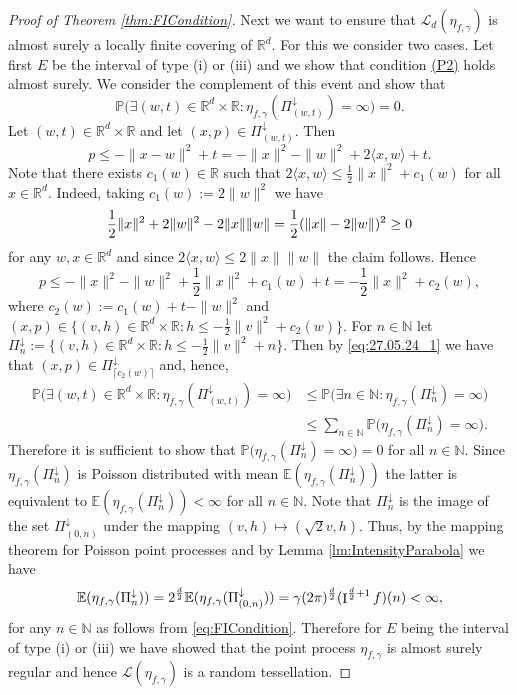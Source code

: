 \documentclass[11pt,a4paper]{article}
\theoremstyle{plain}
\theoremstyle{definition}
\theoremstyle{remark}
\def\EE{\mathbb{E}}
\def\NN{\mathbb{N}}
\def\PP{\mathbb{P}}
\def\RR{\mathbb{R}}
\def\cL{\mathcal{L}}
\newcommand{\frI}{\mathop{\mathrm{I}}\nolimits}
\begin{document}
\begin{proof}[Proof of Theorem \ref{thm:FICondition}]
    Next we want to ensure that $\cL_d(\eta_{f,\gamma})$ is almost surely a locally finite covering of $\RR^d$. For this we consider two cases. Let first $E$ be the interval of type (i) or (iii) and we show that condition \hyperref[item:P2]{(P2)} holds almost surely.
    We consider the complement of this event and show that 
    \[
        \PP\big(\exists (w,t) \in \RR^d \times \RR: \eta_{f,\gamma}(\Pi_{(w,t)}^\downarrow) = \infty\big) = 0. 
    \]
    Let $(w,t)\in \RR^d \times \RR$ and let $(x,p)\in \Pi_{(w,t)}^\downarrow$. Then 
    \[
        p\le -\|x-w\|^2+t=-\|x\|^2-\|w\|^2+2 \langle x,w \rangle +t.
    \]
    Note that there exists $c_1(w)\in \RR$ such that $2\langle x,w \rangle \le \frac{1}{2}\|x\|^2+c_1(w)$ for all $x\in \RR^d$. Indeed, taking $c_1(w):=2\|w\|^2$ we have 
    \[
        {1\over 2}\|x\|^2+2\|w\|^2-2\|x\|\|w\|={1\over 2}(\|x\|-2\|w\|)^2\ge 0
    \]
    for any $w,x\in\RR^d$ and since $2\langle x,w\rangle\leq 2\|x\|\|w\|$ the claim follows. Hence 
    \begin{equation}\label{eq:27.05.24_1}
        p\le -\|x\|^2-\|w\|^2+\frac{1}{2}\|x\|^2+c_1(w)+t=-\frac{1}{2}\|x\|^2+c_2(w),
    \end{equation}
    where $c_2(w):=c_1(w)+t-\|w\|^2$ and $(x,p)\in \{(v,h)\in \RR^d \times \RR: h\le -\frac{1}{2}\|v\|^2+c_2(w)\}$. For $n\in \NN$ let $\Pi_n^\downarrow:=\{(v,h)\in \RR^d \times \RR: h\le -\frac{1}{2}\|v\|^2+n\}$. Then by \eqref{eq:27.05.24_1} we have that $(x,p)\in \Pi_{\lceil c_2(w)\rceil}^\downarrow$ and, hence,
    \begin{align*}
        \PP\big(\exists (w,t) \in \RR^d \times \RR: \eta_{f,\gamma}(\Pi_{(w,t)}^\downarrow) = \infty\big)
        &\le \PP\big(\exists n\in \NN: \eta_{f,\gamma}(\Pi_n^\downarrow) = \infty\big) \\
        &\le \sum_{n\in \NN}\PP\big(\eta_{f,\gamma}(\Pi_n^\downarrow) = \infty\big).
    \end{align*}
    Therefore it is sufficient to show that $\PP\big(\eta_{f,\gamma}(\Pi_n^\downarrow) = \infty\big)=0$ for all $n\in \NN$. 
    Since $\eta_{f,\gamma}(\Pi_{n}^\downarrow)$ is Poisson distributed with mean $\EE(\eta_{f,\gamma}(\Pi_{n}^\downarrow))$ the latter is equivalent to $\EE(\eta_{f,\gamma}(\Pi_{n}^\downarrow)) <\infty$ for all $n \in \NN$. Note that $\Pi_{n}^\downarrow$ is the image of the set $\Pi_{(0,n)}^\downarrow$ under the mapping $(v,h)\mapsto (\sqrt{2}v,h)$. Thus, by the mapping theorem for Poisson point processes \cite[Theorem 5.1]{LP} and by Lemma \ref{lm:IntensityParabola} we have
    \[
        \EE(\eta_{f,\gamma}(\Pi_{n}^\downarrow))=2^{d\over 2}\EE(\eta_{f,\gamma}(\Pi_{(0,n)}^\downarrow))=\gamma(2\pi)^{\frac{d}{2}} (\frI^{\frac{d}{2}+1}f)(n)<\infty,
    \]
    for any $n\in \NN$ as follows from \eqref{eq:FICondition}. Therefore for $E$ being the interval of type (i) or (iii) we have showed that the point process $\eta_{f,\gamma}$ is almost surely regular and hence $\cL(\eta_{f,\gamma})$ is a random tessellation.
    

\end{proof}
\end{document}
